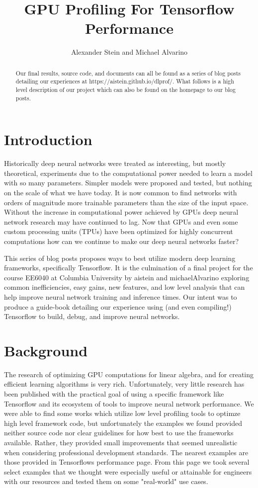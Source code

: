 \documentclass{article}
\title{GPU Profiling For Tensorflow Performance}
\author{Alexander Stein and Michael Alvarino}
\begin{document}
\maketitle

\begin{abstract}
Our final results, source code, and documents can all be found as a series of blog posts detailing our experiences at https://aistein.github.io/dlprof/. What follows is a high level description of our project which can also be found on the homepage to our blog posts.
\end{abstract}

\section{Introduction}
Historically deep neural networks were treated as interesting, but mostly theoretical, experiments due to the computational power needed to learn a model with so many parameters. Simpler models were proposed and tested, but nothing on the scale of what we have today. It is now common to find networks with orders of magnitude more trainable parameters than the size of the input space. Without the increase in computational power achieved by GPUs deep neural network research may have continued to lag. Now that GPUs and even some custom processing units (TPUs) have been optimized for highly concurrent computations how can we continue to make our deep neural networks faster?

This series of blog posts proposes ways to best utilize modern deep learning frameworks, specifically Tensorflow. It is the culmination of a final project for the course EE6040 at Columbia University by aistein and michaelAlvarino exploring common inefficiencies, easy gains, new features, and low level analysis that can help improve neural network training and inference times. Our intent was to produce a guide-book detailing our experience using (and even compiling!) Tensorflow to build, debug, and improve neural networks.

\section{Background}
The research of optimizing GPU computations for linear algebra, and for creating efficient learning algorithms is very rich. Unfortunately, very little research has been published with the practical goal of using a specific framework like Tensorflow and its ecosystem of tools to improve neural network performance. We were able to find some works which utilize low level profiling tools to optimze high level framework code, but unfortunately the examples we found provided neither source code nor clear guidelines for how best to use the frameworks available. Rather, they provided small improvements that seemed unrealistic when considering professional development standards. The nearest examples are those provided in Tensorflows performance page. From this page we took several select examples that we thought were especially useful or attainable for engineers with our resources and tested them on some "real-world" use cases.
\end{document}
